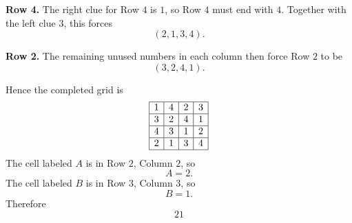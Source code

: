 \documentclass[12pt]{article}
\begin{document}
\noindent \textbf{Row 4.}
The right clue for Row $4$ is $1$, so Row $4$ must end with $4$. Together with the left clue $3$, this forces
\[
(2,1,3,4).
\]

\noindent \textbf{Row 2.}
The remaining unused numbers in each column then force Row $2$ to be
\[
(3,2,4,1).
\]

Hence the completed grid is
\[
\begin{array}{|c|c|c|c|}\hline
1 & 4 & 2 & 3 \\ \hline
3 & 2 & 4 & 1 \\ \hline
4 & 3 & 1 & 2 \\ \hline
2 & 1 & 3 & 4 \\ \hline
\end{array}
\]
The cell labeled $A$ is in Row $2$, Column $2$, so
\[
A=2.
\]
The cell labeled $B$ is in Row $3$, Column $3$, so
\[
B=1.
\]
Therefore
\[
\boxed{21}
\]
\end{document}
